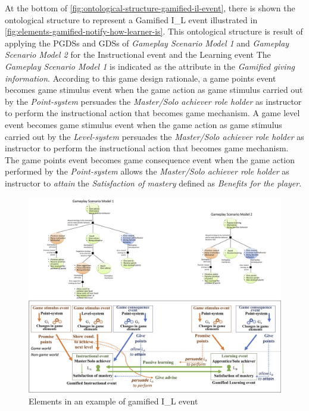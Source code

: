 At the bottom of \autoref{fig:ontological-structure-gamified-il-event}, there is shown the ontological structure to represent a Gamified I\_L event  illustrated in \autoref{fig:elements-gamified-notify-how-learner-is}. This ontological structure is result of applying the PGDSs and GDSs of \emph{Gameplay Scenario Model 1} and \emph{Gameplay Scenario Model 2} for the Instructional event  and the Learning event  The \emph{Gameplay Scenario Model 1} is indicated as the attribute  in the \emph{Gamified giving information}. According to this game design rationale, a game points event becomes game stimulus event when the game action  as game stimulus carried out by the \emph{Point-system} persuades the \emph{Master/Solo achiever role holder} as instructor to perform the instructional action  that becomes game mechanism. A game level event becomes game stimulus event when the game action  as game stimulus carried out by the \emph{Level-system} persuades the \emph{Master/Solo achiever role holder} as instructor to perform the instructional action  that becomes game mechanism. The game points event becomes game consequence event when the game action  performed by the \emph{Point-system} allows the \emph{Master/Solo achiever role holder} as instructor to \emph{attain} the \emph{Satisfaction of mastery} defined as \emph{Benefits for the player}.

\begin{figure}[!htbp]
 \caption[Elements in the example of gamified I\_L event ]{Elements in an example of gamified I\_L event }
 \label{fig:elements-gamified-notify-how-learner-is}
 \centering
 \includegraphics[width=1\textwidth]{images/chap-ontogacles2/elements-gamified-notify-how-learner-is.png}
 \fautor
\end{figure}

